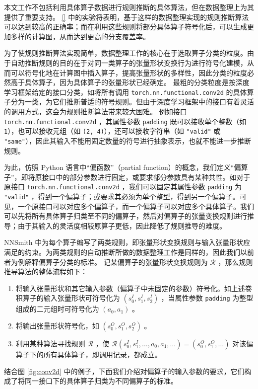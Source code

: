 本文工作不包括利用具体算子数据进行规则推断的具体算法，但在数据整理上为其提供了重要支持。 \ref{} 中的实验将表明，基于这样的数据整理实现的规则推断算法可以达到较高的正确率；而在利用这些规则将部分具体算子符号化后，可以生成更加多样的计算图，从而达到更高的分支覆盖率。

为了使规则推断算法实现简单，数据整理工作的核心在于选取算子分类的粒度。由于自动推断规则的目的在于对同一类算子的张量形状变换行为进行符号化建模，从而可以符号化地在计算图中插入算子，提高张量形状的多样性，因此分类的粒度必然高于具体算子，因为具体算子的张量形状已经确定。
最粗的分类粒度是按深度学习框架给定的接口分类，如将所有调用 \texttt{torch.nn.functional.conv2d} 的具体算子分为一类，为它们推断普适的符号规则。但由于深度学习框架中的接口有着灵活的调用方式，这会为规则推断算法带来较大困难。
例如接口 \texttt{torch.nn.functional.conv2d} \cite{torch_f_conv2d}，其属性参数 \texttt{padding} 既可以接收单个整数（如 \texttt{1}），也可以接收元组（如 \texttt{(2, 4)}），还可以接收字符串（如 \texttt{"valid"} 或 \texttt{"same"}），因此其输入不能用固定数量的符号进行抽象表示，也就不能进一步推断规则。

为此，仿照 Python 语言中“偏函数”（partial function）\cite{python_partial}的概念，我们定义“偏算子”，即将原接口中的部分参数进行固定，或要求部分参数具有某种共性。如对于原接口 \texttt{torch.nn.functional.conv2d} ，我们可以固定其属性参数 \texttt{padding} 为 \texttt{"valid"} ，得到一个偏算子；或要求其必须为单个整型，得到另一个偏算子。可见，一个原接口可以对应多个偏算子，而一个偏算子可以对应多个具体算子。我们可以先将所有具体算子归类至不同的偏算子，然后对偏算子的张量变换规则进行推导；由于其输入的灵活度相较原算子更低，因此降低了规则推导的难度。

NNSmith 中为每个算子编写了两类规则，即张量形状变换规则与输入张量形状应满足的约束。为两类规则的自动推断所做的数据整理工作是同样的，因此我们以前者为例解释偏算子分类的标准。
记某偏算子的张量形状变换规则为 $\mathcal{R}$ ，那么规则推导算法的整体流程如下：
\begin{enumerate}
    \item 将输入张量形状和其它输入参数（偏算子中未固定的参数）符号化。如上述卷积算子的输入张量形状可符号化为 $(s^I_0, s^I_1, s^I_2)$ ，当属性参数 \texttt{padding} 为整型组成的二元组时可符号化为 $(a_0, a_1)$ 。
    \item 将输出张量形状符号化，如 $(s^O_0, s^O_1, s^O_2)$ 。
    \item 利用某种算法寻找规则 $\mathcal{R}$ ，使 $\mathcal{R}(s^I_0, s^I_1, \dots, a_0, a_1, \dots) = (s^O_0, s^O_1, \dots)$ 对该偏算子下的所有具体算子，即调用记录，都成立。
\end{enumerate}
结合图 \ref{fig:conv2d} 中的例子，下面我们介绍对偏算子的输入参数的要求，它们构成了将同一接口下的具体算子归类为不同偏算子的标准。

